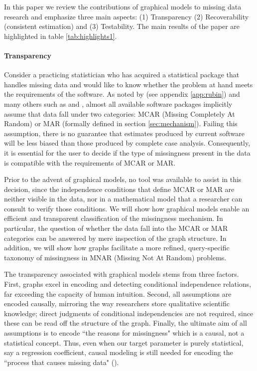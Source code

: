 \documentclass[12pt]{article}
\begin{document}
In this paper we review the contributions of graphical models to
missing data research and emphasize three main aspects: (1) Transparency (2) Recoverability (consistent estimation) and (3) Testability. The main results of the paper are highlighted in table \ref{tab:highlights1}.

\paragraph{Transparency} 
Consider a practicing statistician  who has acquired a
statistical package that handles missing data and would like to
know whether the problem at hand meets
the requirements of the software.
As noted by \cite{Rubin2014} (see appendix \ref{app:rubin}) and
many others such as \cite{rhoads2012problems} and
\cite{balakrishnan2010methods}, almost all available
software packages implicitly assume that data
fall under two categories: MCAR (Missing Completely At Random) or MAR (formally defined in section
\ref{sec:mechanism}).
Failing this assumption, there is no guarantee that
estimates produced by current software will be
less biased than those produced by complete case analysis. %
Consequently, it
is essential for the user to decide if the type of
missingness present in the data is compatible with
the requirements of MCAR or MAR.

Prior to the advent of graphical models, no tool was
available to assist in this decision, since the
independence conditions that define MCAR or MAR
are neither visible in the data, nor in
a mathematical model that a researcher can consult to verify those conditions.
We will show how graphical models enable an efficient
and transparent classification of the missingness
mechanism.  In particular, the question of whether
the data fall into the  MCAR or MAR categories
can be answered by mere inspection of the graph structure.
 In addition, we will show how graphs facilitate 
a more refined, query-specific taxonomy of missingness
in MNAR (Missing Not At Random) problems.

The transparency associated with graphical models 
stems from three factors. First, graphs excel in
encoding and detecting conditional independence relations,
far exceeding the capacity of human intuition. Second,
all assumptions are encoded causally,
mirroring the way researchers store qualitative
scientific knowledge;
direct judgments of conditional independencies are not
required, since these  can be read off the structure of the graph.
Finally, the ultimate aim of all assumptions is to
encode ``the reasons for missingness" which is a causal,
not a statistical concept. Thus, even when our target
parameter is purely statistical, say a
regression coefficient, causal modeling is still
needed for encoding the ``process that causes missing data"
(\cite{Rubin_missing}).
\end{document}
